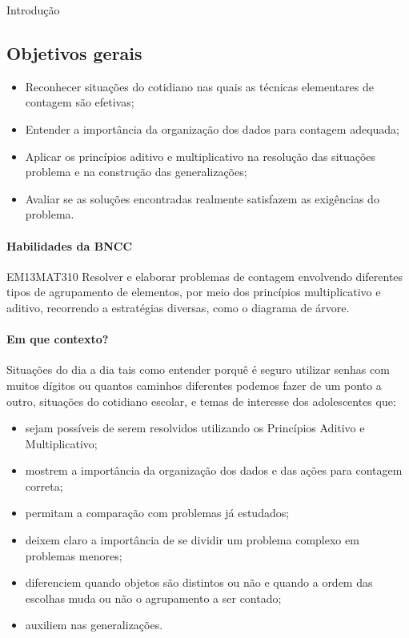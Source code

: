 \mainmatter

\begin{apresentacao}{Introdução}
\subsection{Objetivos gerais}
\begin{itemize}
\item Reconhecer situações do cotidiano nas quais as técnicas elementares de contagem são efetivas; 
\item Entender a importância da organização dos dados para contagem adequada; 
\item Aplicar os princípios aditivo e multiplicativo na resolução das situações problema e na construção das generalizações; 
\item Avaliar se as soluções encontradas realmente satisfazem as exigências do problema.
\end{itemize}

\paragraph{Habilidades da BNCC}

\begin{habilities}{EM13MAT310}
Resolver e elaborar problemas de contagem envolvendo diferentes tipos de agrupamento de elementos, por meio dos princípios multiplicativo e aditivo, recorrendo a estratégias diversas, como o diagrama de árvore.
\end{habilities}

\paragraph{Em que contexto?}

Situações do dia a dia tais como entender porquê é seguro utilizar senhas com muitos dígitos ou quantos caminhos diferentes podemos fazer de um ponto a outro, situações do cotidiano escolar, e temas de interesse dos adolescentes que:

\begin{itemize}

\item sejam possíveis de serem resolvidos utilizando os Princípios Aditivo e Multiplicativo;
\item mostrem a importância da organização dos dados e das ações para contagem correta;
\item permitam a comparação com problemas já estudados;
\item deixem claro a importância de se dividir um problema complexo em problemas menores;
\item diferenciem quando objetos são distintos ou não e quando a ordem das escolhas muda ou não o agrupamento a ser contado;
\item auxiliem nas generalizações.


\end{itemize}
\end{apresentacao}
